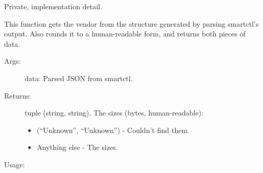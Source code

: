 \documentclass[letterpaper,10pt,english]{sphinxmanual}
\begin{document}
\begin{fulllineitems}
\label{\detokenize{cygwin:getdevinfo.cygwin.get_capacity}}
Private, implementation detail.

This function gets the vendor from the structure generated
by parsing smartctl’s output. Also rounds it to a human-readable
form, and returns both pieces of data.
\begin{description}
\item[{Args:}] \leavevmode
data:   Parsed JSON from smartctl.

\item[{Returns:}] \leavevmode
tuple (string, string). The sizes (bytes, human-readable):
\begin{itemize}
\item {} 
(“Unknown”, “Unknown”)     - Couldn’t find them.

\item {} 
Anything else              - The sizes.

\end{itemize}

\end{description}

Usage:

\begin{sphinxVerbatim}[commandchars=\\\{\}]
   
\end{sphinxVerbatim}

\end{fulllineitems}

\end{document}
